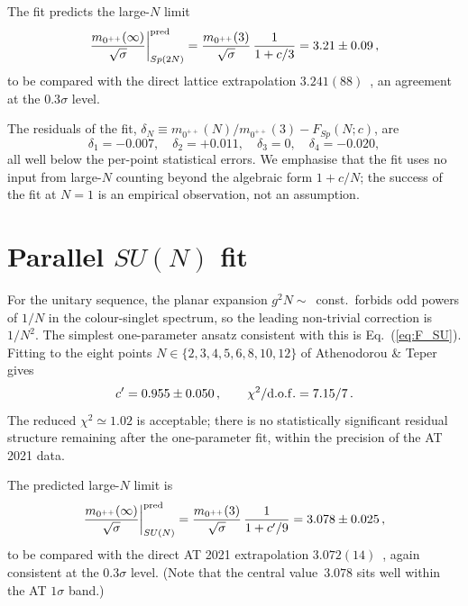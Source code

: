 \documentclass[aps,prd,reprint,nofootinbib,superscriptaddress,floatfix]{revtex4-2}
\begin{document}
The fit predicts the large-$N$ limit
\begin{equation}
   \frac{m_{0^{++}}(\infty)}{\sqrt{\sigma}}\bigg|_{Sp(2N)}^{\rm pred}
   = \frac{m_{0^{++}}(3)}{\sqrt{\sigma}} \,\frac{1}{1 + c/3}
   = 3.21 \pm 0.09\,,
   \label{eq:Sp_inf_pred}
\end{equation}
to be compared with the direct lattice extrapolation
$3.241(88)$~\cite{BennettHolligan2021}, an agreement at the
$0.3\sigma$ level.

The residuals of the fit, $\delta_N \equiv m_{0^{++}}(N)/m_{0^{++}}(3) -
F_{Sp}(N;c)$, are
\begin{equation*}
   \delta_1 = -0.007,\quad
   \delta_2 = +0.011,\quad
   \delta_3 = 0,\quad
   \delta_4 = -0.020,
\end{equation*}
all well below the per-point statistical errors. We emphasise that the
fit uses no input from large-$N$ counting beyond the algebraic form
$1+c/N$; the success of the fit at $N=1$ is an empirical observation,
not an assumption.

\section{Parallel $SU(N)$ fit}\label{sec:fitSU}
For the unitary sequence, the planar expansion $g^2 N \sim$~const.\
forbids odd powers of $1/N$ in the colour-singlet spectrum, so the
leading non-trivial correction is $1/N^2$. The simplest one-parameter
ansatz consistent with this is Eq.~(\ref{eq:F_SU}). Fitting to the
eight points $N \in \{2,3,4,5,6,8,10,12\}$ of
Athenodorou \& Teper~\cite{AthenodorouTeper2021} gives
\begin{equation}
   c' = 0.955 \pm 0.050\,, \qquad
   \chi^{2}/{\rm d.o.f.} = 7.15/7\,.
   \label{eq:SU_result}
\end{equation}
The reduced $\chi^2 \simeq 1.02$ is acceptable; there is no statistically
significant residual structure remaining after the one-parameter fit,
within the precision of the AT 2021 data.

The predicted large-$N$ limit is
\begin{equation}
   \frac{m_{0^{++}}(\infty)}{\sqrt{\sigma}}\bigg|_{SU(N)}^{\rm pred}
   = \frac{m_{0^{++}}(3)}{\sqrt{\sigma}}\,\frac{1}{1 + c'/9}
   = 3.078 \pm 0.025\,,
   \label{eq:SU_inf_pred}
\end{equation}
to be compared with the direct AT 2021
extrapolation $3.072(14)$~\cite{AthenodorouTeper2021}, again
consistent at the $0.3\sigma$ level. (Note that the central value~$3.078$
sits well within the AT $1\sigma$ band.)
\end{document}
